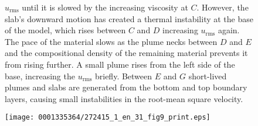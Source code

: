 \begin{figure}[!t]
{    $u_{\mathrm{rms}}$ until it is slowed by the increasing viscosity
    at $C$. However, the slab's downward motion has created a thermal
    instability at the base of the model, which rises between $C$ and
    $D$ increasing $u_{\mathrm{rms}}$ again. The pace of the material
    slows as the plume necks between $D$ and $E$ and the compositional
    density of the remaining material prevents it from rising
    further. A small plume rises from the left side of the base,
    increasing the $u_{\mathrm{rms}}$ briefly. Between $E$ and $G$
    short-lived plumes and slabs are generated from the bottom and top
    boundary layers, causing small instabilities in the root-mean
    square velocity.}\label{vynnytska:fig:BG}\vspace*{-4pt}
\end{figure}
%
\begin{figure}[!t]
\centering
\texttt{[image: 0001335364/272415\_1\_en\_31\_fig9\_print.eps]}

\end{figure}
